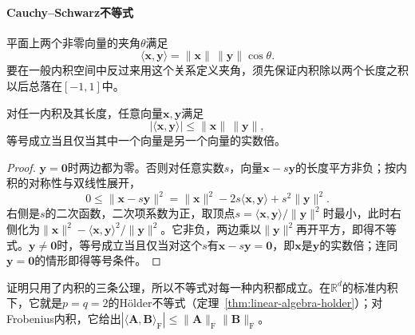 \paragraph{Cauchy--Schwarz不等式}
平面上两个非零向量的夹角$\theta$满足
\[
 \langle\bm x,\bm y\rangle=\lVert\bm x\rVert\,\lVert\bm y\rVert\cos\theta.
\]
要在一般内积空间中反过来用这个关系定义夹角，须先保证内积除以两个长度之积以后总落在$[-1,1]$中。
\begin{theorem}
\label{thm:linear-algebra-cauchy-schwarz}
对任一内积及其长度，任意向量$\bm x,\bm y$满足
\begin{equation}
 |\langle\bm x,\bm y\rangle|\leq\lVert\bm x\rVert\,\lVert\bm y\rVert,
 \label{eq:prelim-cauchy-schwarz}
\end{equation}
等号成立当且仅当其中一个向量是另一个向量的实数倍。
\end{theorem}
\begin{proof}
$\bm y=\bm0$时两边都为零。否则对任意实数$s$，向量$\bm x-s\bm y$的长度平方非负；按内积的对称性与双线性展开，
\[
 0\leq\lVert\bm x-s\bm y\rVert^2
 =\lVert\bm x\rVert^2-2s\langle\bm x,\bm y\rangle+s^2\lVert\bm y\rVert^2.
\]
右侧是$s$的二次函数，二次项系数为正，取顶点$s=\langle\bm x,\bm y\rangle/\lVert\bm y\rVert^2$时最小，此时右侧化为$\lVert\bm x\rVert^2-\langle\bm x,\bm y\rangle^2/\lVert\bm y\rVert^2$。它非负，两边乘以$\lVert\bm y\rVert^2$再开平方，即得不等式。$\bm y\neq\bm0$时，等号成立当且仅当对这个$s$有$\bm x-s\bm y=\bm0$，即$\bm x$是$\bm y$的实数倍；连同$\bm y=\bm0$的情形即得等号条件。
\end{proof}
证明只用了内积的三条公理，所以不等式对每一种内积都成立。在$\mathbb R^d$的标准内积下，它就是$p=q=2$的Hölder不等式（定理~\ref{thm:linear-algebra-holder}）；对Frobenius内积，它给出$|\langle\bm A,\bm B\rangle_{\mathrm F}|\leq\lVert\bm A\rVert_{\mathrm F}\lVert\bm B\rVert_{\mathrm F}$。

